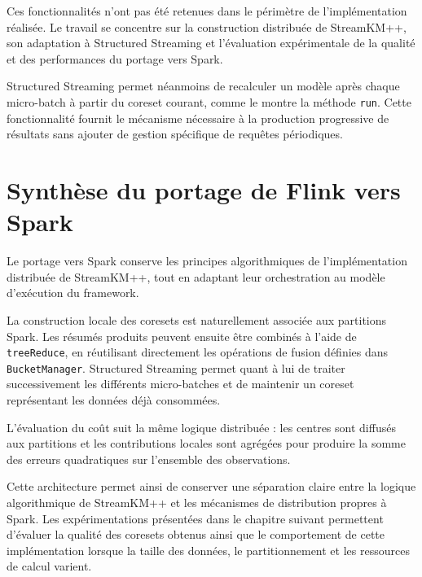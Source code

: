 Ces fonctionnalités n'ont pas été retenues dans le périmètre de l'implémentation réalisée. Le travail se concentre sur la construction distribuée de StreamKM++, son adaptation à Structured Streaming et l'évaluation expérimentale de la qualité et des performances du portage vers Spark.

Structured Streaming permet néanmoins de recalculer un modèle après chaque micro-batch à partir du coreset courant, comme le montre la méthode \texttt{run}. Cette fonctionnalité fournit le mécanisme nécessaire à la production progressive de résultats sans ajouter de gestion spécifique de requêtes périodiques.

\section{Synthèse du portage de Flink vers Spark}
\label{sec:portage-flink-spark}

Le portage vers Spark conserve les principes algorithmiques de l'implémentation distribuée de StreamKM++, tout en adaptant leur orchestration au modèle d'exécution du framework.

La construction locale des coresets est naturellement associée aux partitions Spark. Les résumés produits peuvent ensuite être combinés à l'aide de \texttt{treeReduce}, en réutilisant directement les opérations de fusion définies dans \texttt{BucketManager}. Structured Streaming permet quant à lui de traiter successivement les différents micro-batches et de maintenir un coreset représentant les données déjà consommées.

L'évaluation du coût suit la même logique distribuée : les centres sont diffusés aux partitions et les contributions locales sont agrégées pour produire la somme des erreurs quadratiques sur l'ensemble des observations.

Cette architecture permet ainsi de conserver une séparation claire entre la logique algorithmique de StreamKM++ et les mécanismes de distribution propres à Spark. Les expérimentations présentées dans le chapitre suivant permettent d'évaluer la qualité des coresets obtenus ainsi que le comportement de cette implémentation lorsque la taille des données, le partitionnement et les ressources de calcul varient.

